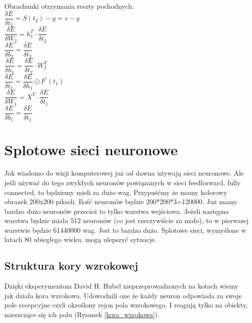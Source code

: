 \documentclass{article}
\begin{document}
\begin{flushleft}
Obrachunki otrzymania reszty pochodnych:\\
$\dfrac{\delta E}{\delta t_2} = S(t_2)-y=z-y$\\
\vspace{5mm}
$\dfrac{\delta E}{\delta W_2} = h_1^T \cdot \dfrac{\delta E}{\delta t_2}$\\
$\dfrac{\delta E}{\delta b_2} = \dfrac{\delta E}{\delta t_2}$\\
\vspace{5mm}
$\dfrac{\delta E}{\delta h_1} = \dfrac{\delta E}{\delta t_2} \cdot W_2^T$\\
$\dfrac{\delta E}{\delta t_1} = \dfrac{\delta E}{\delta h_1} \odot F^\prime (t_1)$\\
\vspace{5mm}
$\dfrac{\delta E}{\delta W_1} = X^T \cdot \dfrac{\delta E}{\delta t_1}$\\
$\dfrac{\delta E}{\delta b_1} = \dfrac{\delta E}{\delta t_1}$
\end{flushleft}

\section{Splotowe sieci neuronowe}
Jak wiadomo do wizji komputerowej już od dawna używają sieci neuronowe. Ale jeśli używać do tego zwykłych neuronów powiązanych w sieci feedforward, fully connected, to będziemy mieli za dużo wag. Przypuśćmy że mamy kolorowy obrazek 200x200 pikseli. Ilość neuronów będzie 200*200*3=120000. Już mamy bardzo dużo neuronów przecież to tylko warstwa wejściowa. Jeżeli następna warstwa będzie miała 512 neuronów (co jest rzeczywiście za mało), to w pierwszej warstwie będzie 61440000 wag. Jest to bardzo dużo. 
Splotowe sieci, wymyślone w latach 80 ubiegłego wieku, mogą ulepszyć sytuacje.

\subsection{Struktura kory wzrokowej}
Dzięki eksperymentom David H. Hubel nieprzeprowadzonych na kotach wiemy jak działa kora wzrokowa.\cite{David_1958} \cite{David_1959}
Udowodnili one że każdy neuron odpowiada za swoje pole recepcyjne czyli określony rejon pola wzrokowego. I reagują tylko na obiekty, mieszczące się ich polu (Rysunek \ref{kora_wzrokowa}). \cite{geron}
\end{document}
